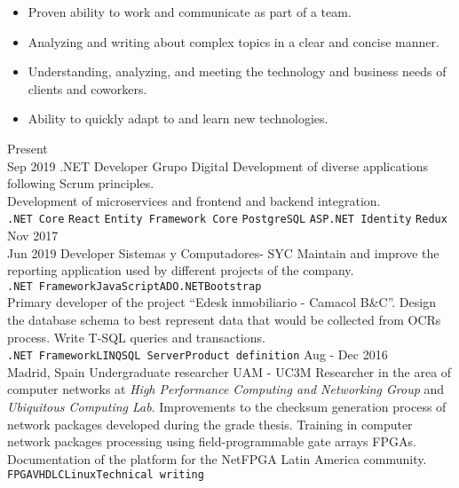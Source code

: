 \documentclass[9pt]{developercv}
\begin{document}
	\begin{minipage}{0.6\textwidth}	
		\begin{itemize}[noitemsep,nolistsep,leftmargin=*]
			\item Proven ability to work and communicate as part of a team.
			\item Analyzing and writing about complex topics in a clear and concise manner.
			\item Understanding, analyzing, and meeting the technology and business needs of clients and coworkers.
			\item Ability to quickly adapt to and learn new technologies.
		\end{itemize}	
	\end{minipage}
	\begin{minipage}{0.4\textwidth}
		\begin{barchart}{5.5}
		\end{barchart}
	\end{minipage}
	\vspace{-\baselineskip}
	\begin{entrylist}
		\entry
		{Present\\Sep 2019}
		{.NET Developer}
		{Grupo Digital}
		{
			Development of diverse applications following Scrum principles.\\
			Development of microservices and frontend and backend integration.\\
			\texttt{.NET Core}\slashsep
			\texttt{React}\slashsep
			\texttt{Entity Framework Core}\slashsep
			\texttt{PostgreSQL}\slashsep
			\texttt{ASP.NET Identity}\slashsep
			\texttt{Redux}
		}
		\entry
		{Nov 2017\\Jun 2019}
		{Developer}
		{Sistemas y Computadores- SYC}
		{
			Maintain and improve the reporting application used by different projects of the company.\\
			\texttt{.NET Framework\slashsep JavaScript\slashsep ADO.NET\slashsep Bootstrap}\\
			Primary developer of the project “Edesk inmobiliario - Camacol B\&C”. Design the database schema to best represent data that would be collected from OCRs process. Write T-SQL queries and transactions.\\
			\texttt{.NET Framework\slashsep LINQ\slashsep SQL Server\slashsep Product definition}
		}
		\entry
		{Aug - Dec 2016\\Madrid, Spain}
		{Undergraduate researcher}
		{UAM - UC3M}
		{
			Researcher in the area of computer networks at \textit{High Performance Computing and Networking Group} and \textit{Ubiquitous Computing Lab}.
			Improvements to the checksum generation process of network packages developed during the grade thesis.
			Training in computer network packages processing using field-programmable gate arrays FPGAs.
			Documentation of the platform for the NetFPGA Latin America community.\\
			\texttt{FPGA\slashsep VHDL\slashsep C\slashsep Linux\slashsep Technical writing}                
		}
	\end{entrylist}
\end{document}

